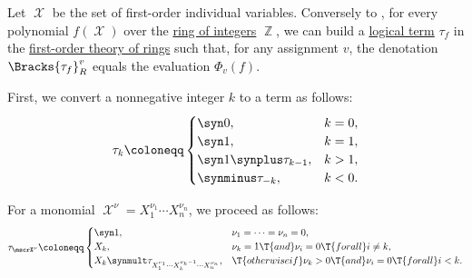 \begin{algorithm}\label{alg:integer_polynomial_to_logical_term}
  Let \( \mscrX \) be the set of first-order individual variables. Conversely to , for every polynomial \( f(\mscrX) \) over the \hyperref[def:integers]{ring of integers} \( \BbbZ \), we can build a \hyperref[def:fol_term]{logical term} \( \tau_f \) in the \hyperref[def:ring/theory]{first-order theory of rings} such that, for any assignment \( v \), the denotation \( \Bracks{ \tau_f }_R^v \) equals the evaluation \( \Phi_v(f) \).

  \begin{thmenum}
     First, we convert a nonnegative integer \( k \) to a term as follows:
    \begin{equation}\label{eq:alg:logical_term_to_integer_polynomial/number}
      \tau_k \coloneqq \begin{cases}
        \syn0,                     &k = 0, \\
        \syn1,                     &k = 1, \\
        \syn1 \synplus \tau_{k-1}, &k > 1, \\
        \synminus \tau_{-k},       &k < 0.
      \end{cases}
    \end{equation}

     For a monomial \( \mscrX^\nu = X_1^{\nu_1} \cdots X_n^{\nu_n} \), we proceed as follows:
    \begin{equation}\label{eq:alg:logical_term_to_integer_polynomial/monomial}
      \tau_{\mscrX^\nu} \coloneqq \begin{cases}
        \syn1,                                                                     &\nu_1 = \cdots = \nu_n = 0, \\
        X_k,                                                                       &\nu_k = 1 \T{and} \nu_i = 0 \T{for all} i \neq k, \\
        X_k \synmult \tau_{X_1^{\nu_1} \cdots X_k^{\nu_k - 1} \cdots X_n^{\nu_n}}, &\T{otherwise if} \nu_k > 0 \T{and} \nu_i = 0 \T{for all} i < k.
      \end{cases}
    \end{equation}


\end{thmenum}
\end{algorithm}
